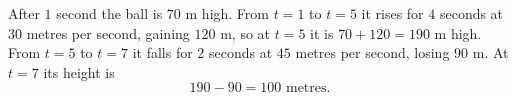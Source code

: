 After $1$ second the ball is $70$ m high. From $t=1$ to $t=5$ it rises for $4$ seconds at $30$ metres per second, gaining $120$ m, so at $t=5$ it is $70+120=190$ m high. From $t=5$ to $t=7$ it falls for $2$ seconds at $45$ metres per second, losing $90$ m. At $t=7$ its height is
\[
190-90=\boxed{100\text{ metres}}.
\]

